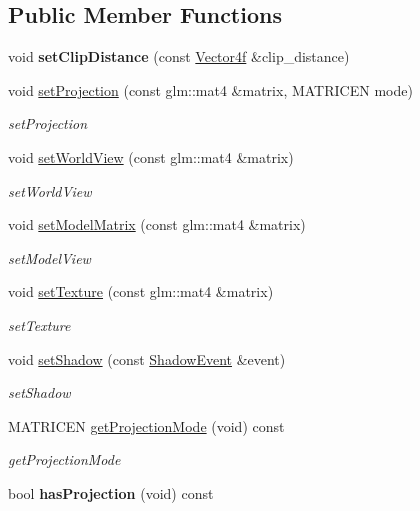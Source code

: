 \subsection*{Public Member Functions}
\begin{DoxyCompactItemize}
\item 
\hypertarget{classEngine_1_1DrawEvent_ac70cac77946442fa4f79f74097c3c1fb}{}void {\bfseries set\+Clip\+Distance} (const \hyperlink{classVector4}{Vector4f} \&clip\+\_\+distance)\label{classEngine_1_1DrawEvent_ac70cac77946442fa4f79f74097c3c1fb}

\item 
void \hyperlink{classEngine_1_1DrawEvent_adfcef67906c6b67390dfa83b92394d1a}{set\+Projection} (const glm\+::mat4 \&matrix, M\+A\+T\+R\+I\+C\+E\+N mode)
\begin{DoxyCompactList}\small\item\em set\+Projection \end{DoxyCompactList}\item 
void \hyperlink{classEngine_1_1DrawEvent_a59cf1065d97426947dcb92f4499b8c59}{set\+World\+View} (const glm\+::mat4 \&matrix)
\begin{DoxyCompactList}\small\item\em set\+World\+View \end{DoxyCompactList}\item 
void \hyperlink{classEngine_1_1DrawEvent_a4f6c4ed1ddda804cf905be74cbac909b}{set\+Model\+Matrix} (const glm\+::mat4 \&matrix)
\begin{DoxyCompactList}\small\item\em set\+Model\+View \end{DoxyCompactList}\item 
void \hyperlink{classEngine_1_1DrawEvent_a4fc992cab407a9e77ba4ad2ea85614d7}{set\+Texture} (const glm\+::mat4 \&matrix)
\begin{DoxyCompactList}\small\item\em set\+Texture \end{DoxyCompactList}\item 
void \hyperlink{classEngine_1_1DrawEvent_a496fa555d7762b2d0e6501fd5df6ecb5}{set\+Shadow} (const \hyperlink{classEngine_1_1ShadowEvent}{Shadow\+Event} \&event)
\begin{DoxyCompactList}\small\item\em set\+Shadow \end{DoxyCompactList}\item 
M\+A\+T\+R\+I\+C\+E\+N \hyperlink{classEngine_1_1DrawEvent_aeb66407c993f03211d133a5ddbd5ad6b}{get\+Projection\+Mode} (void) const 
\begin{DoxyCompactList}\small\item\em get\+Projection\+Mode \end{DoxyCompactList}\item 
\hypertarget{classEngine_1_1DrawEvent_aaaaa58ede3268870fb5542e35afb0b52}{}bool {\bfseries has\+Projection} (void) const \label{classEngine_1_1DrawEvent_aaaaa58ede3268870fb5542e35afb0b52}


\end{DoxyCompactItemize}
